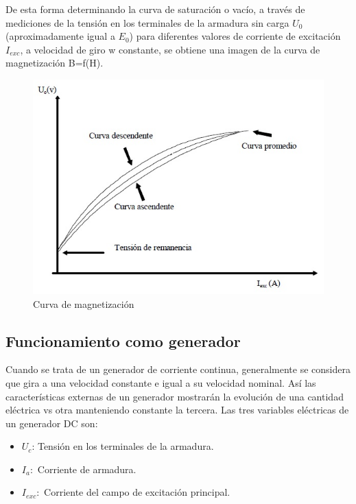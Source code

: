 \documentclass[11pt,letterpaper]{article}     %
\begin{document}
De esta forma determinando la curva de saturación o vacío, a través de
mediciones de la tensión en los terminales de la armadura sin carga $U_{0}$
(aproximadamente igual a $E_{0}$) para diferentes valores de corriente de excitación $I_{exc}$, a velocidad de giro w constante, se obtiene una imagen de la curva de magnetización B=f(H).
\begin{figure}[H]
    \centering
    \includegraphics[scale=0.5]{recursos-Lab6/curvaDeVacioTeo.jpg}
    \caption{Curva de magnetización}
    \label{fig:curvaDeVacioTeo}
\end{figure}
\subsection{Funcionamiento como generador}
Cuando se trata de un generador de corriente continua, generalmente se
considera que gira a una velocidad constante e igual a su velocidad nominal. Así
las características externas de un generador mostrarán la evolución de una
cantidad eléctrica vs otra manteniendo constante la tercera.
Las tres variables eléctricas de un generador DC son:
\begin{itemize}
    \item $U_{c}$: Tensión en los terminales de la armadura.
    \item $I_{a}:$ Corriente de armadura.
    \item $I_{exc}:$ Corriente del campo de excitación principal.
\end{itemize}
\end{document}
